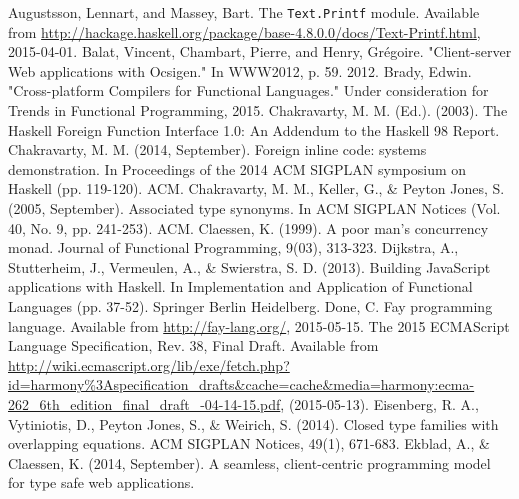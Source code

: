 \documentclass{sigplanconf}
\begin{document}
\begin{thebibliography}{}
\softraggedright

  Augustsson, Lennart, and Massey, Bart. The {\tt Text.Printf} module.
  Available from \url{http://hackage.haskell.org/package/base-4.8.0.0/docs/Text-Printf.html},
  2015-04-01.
  Balat, Vincent, Chambart, Pierre, and Henry, Grégoire.
  "Client-server Web applications with Ocsigen." In WWW2012, p. 59. 2012.
  Brady, Edwin.
  "Cross-platform Compilers for Functional Languages."
  Under consideration for Trends in Functional Programming, 2015.
  Chakravarty, M. M. (Ed.). (2003).
  The Haskell Foreign Function Interface 1.0: An Addendum to the Haskell 98
  Report.
  Chakravarty, M. M. (2014, September).
  Foreign inline code: systems demonstration.
  In Proceedings of the 2014 ACM SIGPLAN symposium on Haskell (pp. 119-120).
  ACM.
  Chakravarty, M. M., Keller, G., \& Peyton Jones, S. (2005, September).
  Associated type synonyms.
  In ACM SIGPLAN Notices (Vol. 40, No. 9, pp. 241-253). ACM.
  Claessen, K. (1999).
  A poor man's concurrency monad.
  Journal of Functional Programming, 9(03), 313-323.
  Dijkstra, A., Stutterheim, J., Vermeulen, A., \& Swierstra, S. D. (2013).
  Building JavaScript applications with Haskell.
  In Implementation and Application of Functional Languages (pp. 37-52).
  Springer Berlin Heidelberg.
  Done, C.
  Fay programming language.
  Available from \url{http://fay-lang.org/}, 2015-05-15.
  The 2015 ECMAScript Language Specification, Rev. 38, Final Draft.
  Available from \url{http://wiki.ecmascript.org/lib/exe/fetch.php?id=harmony%3Aspecification_drafts&cache=cache&media=harmony:ecma-262_6th_edition_final_draft_-04-14-15.pdf},
  (2015-05-13).
  Eisenberg, R. A., Vytiniotis, D., Peyton Jones, S., \& Weirich, S. (2014).
  Closed type families with overlapping equations.
  ACM SIGPLAN Notices, 49(1), 671-683.
  Ekblad, A., \& Claessen, K. (2014, September).
  A seamless, client-centric programming model for type safe web applications.

\end{thebibliography}
\end{document}
